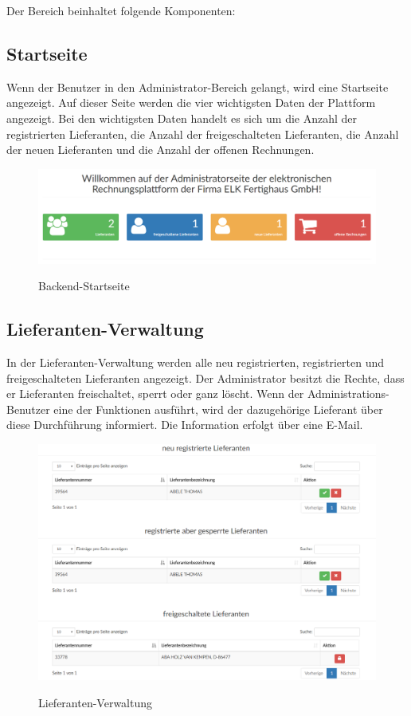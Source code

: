 Der Bereich beinhaltet folgende Komponenten:
\subsection{Startseite}
Wenn der Benutzer in den Administrator-Bereich gelangt, wird eine Startseite angezeigt. Auf dieser Seite werden die vier wichtigsten Daten der Plattform angezeigt. Bei den wichtigsten Daten handelt es sich um die Anzahl der registrierten Lieferanten, die Anzahl der freigeschalteten Lieferanten, die Anzahl der neuen Lieferanten und die Anzahl der offenen Rechnungen.
\begin{figure}[!h]
    \centering
    \includegraphics[width=15cm]{figures/backend.png}
    \label{fig:backendstartseite}
    \caption{Backend-Startseite}
\end{figure}
\newpage
\subsection{Lieferanten-Verwaltung}
In der Lieferanten-Verwaltung werden alle neu registrierten, registrierten und freigeschalteten Lieferanten angezeigt. Der Administrator besitzt die Rechte, dass er Lieferanten freischaltet, sperrt oder ganz löscht. Wenn der Administrations-Benutzer eine der Funktionen ausführt, wird der dazugehörige Lieferant über diese Durchführung informiert. Die Information erfolgt über eine E-Mail.
\begin{figure}[!h]
    \centering
    \includegraphics[width=17cm]{figures/lieferant.png}
    \label{fig:lieferantenverwaltung}
    \caption{Lieferanten-Verwaltung}
\end{figure}
\newpage
